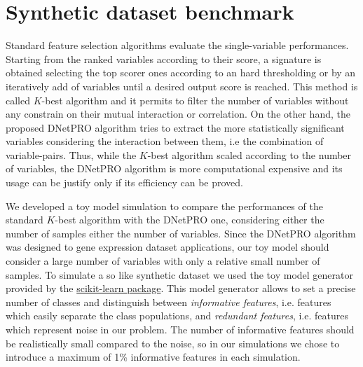 \documentclass{standalone}
\begin{document}
\section[Toy Model]{Synthetic dataset benchmark}\label{dnetpro:toy}

Standard feature selection algorithms evaluate the single-variable performances.
Starting from the ranked variables according to their score, a signature is obtained selecting the top scorer ones according to an hard thresholding or by an iteratively add of variables until a desired output score is reached.
This method is called $K$-best algorithm and it permits to filter the number of variables without any constrain on their mutual interaction or correlation.
On the other hand, the proposed \textsf{DNetPRO} algorithm tries to extract the more statistically significant variables considering the interaction between them, i.e the combination of variable-pairs.
Thus, while the $K$-best algorithm scaled according to the number of variables, the \textsf{DNetPRO} algorithm is more computational expensive and its usage can be justify only if its efficiency can be proved.

We developed a toy model simulation to compare the performances of the standard $K$-best algorithm with the \textsf{DNetPRO} one, considering either the number of samples either the number of variables.
Since the \textsf{DNetPRO} algorithm was designed to gene expression dataset applications, our toy model should consider a large number of variables with only a relative small number of samples.
To simulate a so like synthetic dataset we used the toy model generator provided by the \href{https://scikit-learn.org/stable/modules/generated/sklearn.datasets.make_classification.html}{scikit-learn package}.
This model generator allows to set a precise number of classes and distinguish between \emph{informative features}, i.e. features which easily separate the class populations, and \emph{redundant features}, i.e. features which represent noise in our problem.
The number of informative features should be realistically small compared to the noise, so in our simulations we chose to introduce a maximum of 1\% informative features in each simulation.
\end{document}
